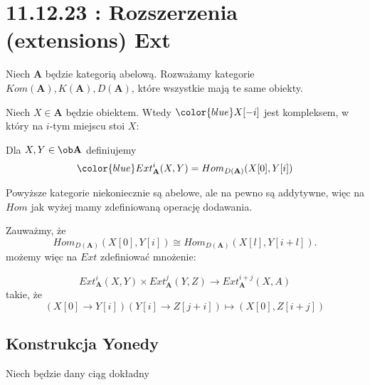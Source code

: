 \section{11.12.23 : Rozszerzenia (extensions) Ext}
 
\begin{definition}
  Niech $\mathbf{A}$ będzie kategorią abelową. Rozważamy kategorie $Kom(\mathbf{A}), K(\mathbf{A}), D(\mathbf{A})$, które wszystkie mają te same obiekty.

  Niech $X\in\mathbf{A}$ będzie obiektem. Wtedy $\color{blue}X[-i]$ jest kompleksem, w który na $i$-tym miejscu stoi $X$:
  \begin{center}\end{center}

  Dla $X,Y\in\ob\mathbf{A}$ definiujemy
  $$\color{blue}Ext_{\mathbf{A}}^i(X, Y)=Hom_{D(\mathbf{A})}(X[0], Y[i])$$
\end{definition}

Powyższe kategorie niekoniecznie są abelowe, ale na pewno są addytywne, więc na $Hom$ jak wyżej mamy zdefiniowaną operację dodawania.

Zauważmy, że
$$Hom_{D(\mathbf{A})}(X[0], Y[i])\cong Hom_{D(\mathbf{A})}(X[l], Y[i+l]).$$
możemy więc na $Ext$ zdefiniować mnożenie:
\begin{definition}
  $$Ext_{\mathbf{A}}^i(X, Y)\times Ext_{\mathbf{A}}^j(Y, Z)\xrightarrow{} Ext_{\mathbf{A}}^{i+j}(X, A)$$
  takie, że
  $$(X[0]\to Y[i])(Y[i]\to Z[j+i])\mapsto(X[0], Z[i+j])$$
\end{definition}

\subsection{Konstrukcja Yonedy}

Niech będzie dany ciąg dokładny
\begin{center}\end{center}

